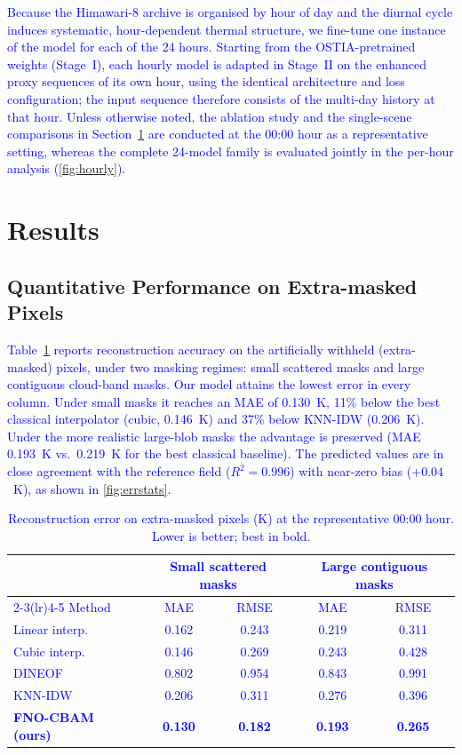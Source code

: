 \documentclass[12pt,reqno]{amsart}
\def\tb{\textcolor{blue}}
\begin{document}
\tb{Because the Himawari-8 archive is organised by hour of day and the diurnal
cycle induces systematic, hour-dependent thermal structure, we fine-tune one
instance of the model for each of the 24 hours. Starting from the
OSTIA-pretrained weights (Stage~I), each hourly model is adapted in Stage~II on
the enhanced proxy sequences of its own hour, using the identical architecture
and loss configuration; the input sequence therefore consists of the multi-day
history at that hour. Unless otherwise noted, the ablation study and the
single-scene comparisons in Section~\ref{sec:results} are conducted at the
00:00 hour as a representative setting, whereas the complete 24-model family is
evaluated jointly in the per-hour analysis (\cref{fig:hourly}).}



\section{Results}
\label{sec:results}

\subsection{Quantitative Performance on Extra-masked Pixels}

\tb{Table~\ref{tab:overall} reports reconstruction accuracy on the artificially
withheld (extra-masked) pixels, under two masking regimes: small scattered masks
and large contiguous cloud-band masks. Our model attains the lowest error in
every column. Under small masks it reaches an MAE of 0.130~K, 11\% below the best
classical interpolator (cubic, 0.146~K) and 37\% below KNN-IDW (0.206~K). Under
the more realistic large-blob masks the advantage is preserved (MAE 0.193~K vs.\
0.219~K for the best classical baseline). The predicted values are in close
agreement with the reference field ($R^2=0.996$) with near-zero bias
($+0.04$~K), as shown in \cref{fig:errstats}.}

\begin{table}[t]\centering
\caption{\tb{Reconstruction error on extra-masked pixels (K) at the
representative 00:00 hour. Lower is better; best in bold.}}
\label{tab:overall}
\tb{\begin{tabular}{lcccc}
\toprule
& \multicolumn{2}{c}{Small scattered masks} & \multicolumn{2}{c}{Large contiguous masks}\\
\cmidrule(lr){2-3}\cmidrule(lr){4-5}
Method & MAE & RMSE & MAE & RMSE\\
\midrule
Linear interp. & 0.162 & 0.243 & 0.219 & 0.311\\
Cubic interp.  & 0.146 & 0.269 & 0.243 & 0.428\\
DINEOF         & 0.802 & 0.954 & 0.843 & 0.991\\
KNN-IDW        & 0.206 & 0.311 & 0.276 & 0.396\\
\textbf{FNO-CBAM (ours)} & \textbf{0.130} & \textbf{0.182} & \textbf{0.193} & \textbf{0.265}\\
\bottomrule
\end{tabular}}
\end{table}
\end{document}
